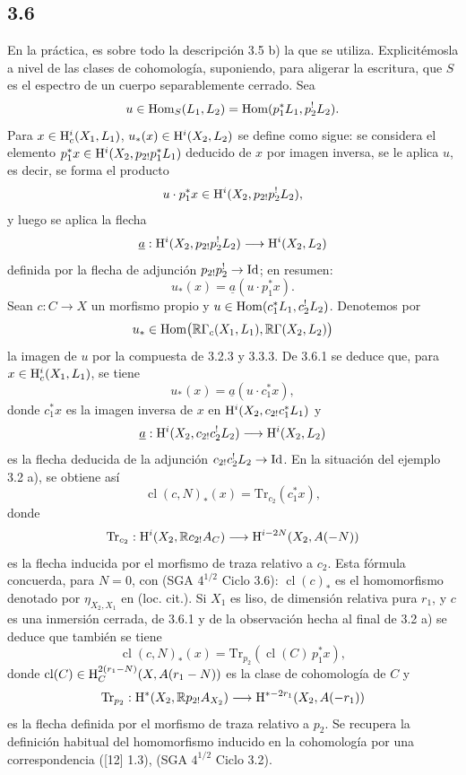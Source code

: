 \subsection*{3.6}
En la práctica, es sobre todo la descripción 3.5 b) la que se utiliza. Explicitémosla a nivel de las clases de cohomología, suponiendo, para aligerar la escritura, que $S$ es el espectro de un cuerpo separablemente cerrado. Sea
\[
u\in\operatorname{Hom}_S(L_1,L_2)=\operatorname{Hom}(p_1^*L_1,p_2^!L_2).
\]
Para $x\in\mathrm{H}_c^i(X_1,L_1)$, $u_*(x)\in\mathrm{H}^i(X_2,L_2)$ se define como sigue: se considera el elemento $p_1^*x\in\mathrm{H}^i(X_2,p_{2!}p_1^*L_1)$ deducido de $x$ por imagen inversa, se le aplica $u$, es decir, se forma el producto
\[
u\cdot p_1^*x\in \mathrm{H}^i(X_2,p_{2!}p_2^!L_2),
\]
y luego se aplica la flecha
\[
\underline{a}:\mathrm{H}^i(X_2,p_{2!}p_2^!L_2)\longrightarrow \mathrm{H}^i(X_2,L_2)
\]
definida por la flecha de adjunción $p_{2!}p_2^!\to\mathrm{Id}$; en resumen:
\begin{equation}
u_*(x)=\underline{a}(u\cdot p_1^*x).
\tag{3.6.1}
\end{equation}
Sean $c:C\to X$ un morfismo propio y $u\in\operatorname{Hom}(c_1^*L_1,c_2^!L_2)$. Denotemos por
\[
u_*\in\operatorname{Hom}\bigl(\mathbb{R}\Gamma_c(X_1,L_1),\mathbb{R}\Gamma(X_2,L_2)\bigr)
\]
la imagen de $u$ por la compuesta de 3.2.3 y 3.3.3. De 3.6.1 se deduce que, para $x\in\mathrm{H}_c^i(X_1,L_1)$, se tiene
\begin{equation}
u_*(x)=\underline{a}(u\cdot c_1^*x),
\tag{3.6.2}
\end{equation}
donde $c_1^*x$ es la imagen inversa de $x$ en $\mathrm{H}^i(X_2,c_{2!}c_1^*L_1)$ y
\[
\underline{a}:\mathrm{H}^i(X_2,c_{2!}c_2^!L_2)\longrightarrow \mathrm{H}^i(X_2,L_2)
\]
es la flecha deducida de la adjunción $c_{2!}c_2^!L_2\to\mathrm{Id}$. En la situación del ejemplo 3.2 a), se obtiene así
\begin{equation}
\operatorname{cl}(c,N)_*(x)=\mathrm{Tr}_{c_2}(c_1^*x),
\tag{3.6.3}
\end{equation}
donde
\[
\mathrm{Tr}_{c_2}:\mathrm{H}^i(X_2,\mathbb{R} c_{2!}A_C)\longrightarrow\mathrm{H}^{i-2N}(X_2,A(-N))
\]
es la flecha inducida por el morfismo de traza relativo a $c_2$. Esta fórmula concuerda, para $N=0$, con (SGA $4^{1/2}$ Ciclo 3.6): $\operatorname{cl}(c)_*$ es el homomorfismo denotado por $\eta_{X_2,X_1}$ en (loc. cit.). Si $X_1$ es liso, de dimensión relativa pura $r_1$, y $c$ es una inmersión cerrada, de 3.6.1 y de la observación hecha al final de 3.2 a) se deduce que también se tiene
\begin{equation}
\operatorname{cl}(c,N)_*(x)=\mathrm{Tr}_{p_2}(\operatorname{cl}(C)\,p_1^*x),
\tag{3.6.4}
\end{equation}
donde $\operatorname{cl}(C)\in \mathrm{H}_C^{2(r_1-N)}(X,A(r_1-N))$ es la clase de cohomología de $C$ y
\[
\mathrm{Tr}_{p_2}:\mathrm{H}^*(X_2,\mathbb{R} p_{2!}A_{X_2})\longrightarrow \mathrm{H}^{*-2r_1}(X_2,A(-r_1))
\]
es la flecha definida por el morfismo de traza relativo a $p_2$. Se recupera la definición habitual del homomorfismo inducido en la cohomología por una correspondencia ([12] 1.3), (SGA $4^{1/2}$ Ciclo 3.2).

